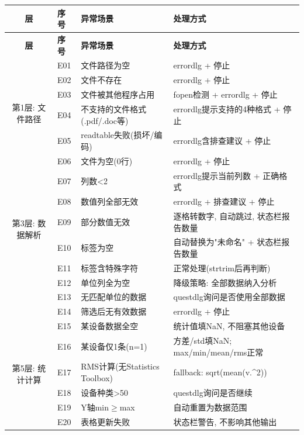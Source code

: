 \documentclass[12pt,a3paper]{ctexart}
\begin{document}
\begin{longtable}{c|l|l|l}
\toprule
\textbf{层} & \textbf{序号} & \textbf{异常场景} & \textbf{处理方式} \\
\midrule
\endfirsthead
\toprule
\textbf{层} & \textbf{序号} & \textbf{异常场景} & \textbf{处理方式} \\
\midrule
\endhead

\multirow{6}{*}{第1层: 文件路径}
& E01 & 文件路径为空 & errordlg + 停止 \\
& E02 & 文件不存在 & errordlg + 停止 \\
& E03 & 文件被其他程序占用 & fopen检测 + errordlg + 停止 \\
\hline

\multirow{4}{*}{第2层: 文件读取}
& E04 & 不支持的文件格式(.pdf/.doc等) & errordlg提示支持的4种格式 + 停止 \\
& E05 & readtable失败(损坏/编码) & errordlg含排查建议 + 停止 \\
& E06 & 文件为空(0行) & errordlg + 停止 \\
\hline

\multirow{6}{*}{第3层: 数据解析}
& E07 & 列数<2 & errordlg提示当前列数 + 正确格式 \\
& E08 & 数值列全部无效 & errordlg + 排查建议 + 停止 \\
& E09 & 部分数值无效 & 逐格转数字, 自动跳过, 状态栏报告数量 \\
& E10 & 标签为空 & 自动替换为"未命名" + 状态栏报告数量 \\
& E11 & 标签含特殊字符 & 正常处理(strtrim后再判断) \\
\hline

\multirow{4}{*}{第4层: 数据筛选}
& E12 & 单位列全为空 & 降级策略: 全部数据纳入分析 \\
& E13 & 无匹配单位的数据 & questdlg询问是否使用全部数据 \\
& E14 & 筛选后无有效数据 & errordlg + 停止 \\
\hline

\multirow{7}{*}{第5层: 统计计算}
& E15 & 某设备数据全空 & 统计值填NaN, 不阻塞其他设备 \\
& E16 & 某设备仅1条(n=1) & 方差/std填NaN; max/min/mean/rms正常 \\
& E17 & RMS计算(无Statistics Toolbox) & fallback: sqrt(mean(v.\^{}2)) \\
& E18 & 设备种类>50 & questdlg询问是否继续 \\
& E19 & Y轴min$\ge$max & 自动重置为数据范围 \\
& E20 & 表格更新失败 & 状态栏警告, 不影响其他输出 \\
\hline


\end{longtable}
\end{document}
